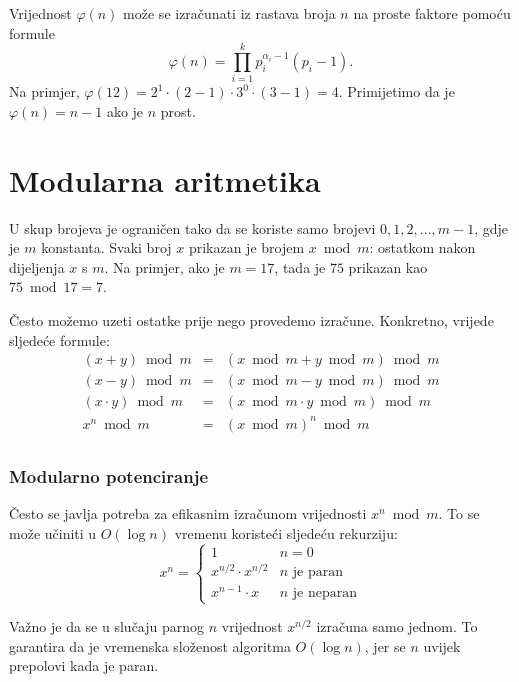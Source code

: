 Vrijednost $\varphi(n)$ može se izračunati
iz rastava broja $n$ na proste faktore
pomoću formule
\[ \varphi(n) = \prod_{i=1}^k p_i^{\alpha_i-1}(p_i-1). \]
Na primjer, $\varphi(12)=2^1 \cdot (2-1) \cdot 3^0 \cdot (3-1)=4$.
Primijetimo da je $\varphi(n)=n-1$ ako je $n$ prost.

\section{Modularna aritmetika}


U 
skup brojeva je ograničen tako
da se koriste samo brojevi $0,1,2,\ldots,m-1$,
gdje je $m$ konstanta.
Svaki broj $x$
prikazan je brojem $x \bmod m$:
ostatkom nakon dijeljenja $x$ s $m$.
Na primjer, ako je $m=17$, tada je $75$
prikazan kao $75 \bmod 17 = 7$.

Često možemo uzeti ostatke prije nego provedemo
izračune.
Konkretno, vrijede sljedeće formule:
\[
\begin{array}{rcl}
(x+y) \bmod m & = & (x \bmod m + y \bmod m) \bmod m \\
(x-y) \bmod m & = & (x \bmod m - y \bmod m) \bmod m \\
(x \cdot y) \bmod m & = & (x \bmod m \cdot y \bmod m) \bmod m \\
x^n \bmod m & = & (x \bmod m)^n \bmod m \\
\end{array}
\]

\subsubsection{Modularno potenciranje}

Često se javlja potreba za efikasnim izračunom
vrijednosti $x^n \bmod m$.
To se može učiniti u $O(\log n)$ vremenu
koristeći sljedeću rekurziju:
\begin{equation*}
    x^n = \begin{cases}
               1        & n = 0\\
               x^{n/2} \cdot x^{n/2} & \text{$n$ je paran}\\
               x^{n-1} \cdot x & \text{$n$ je neparan}
           \end{cases}
\end{equation*}

Važno je da se u slučaju parnog $n$
vrijednost $x^{n/2}$ izračuna samo jednom.
To garantira da je vremenska složenost
algoritma $O(\log n)$, jer se $n$ uvijek prepolovi
kada je paran.

